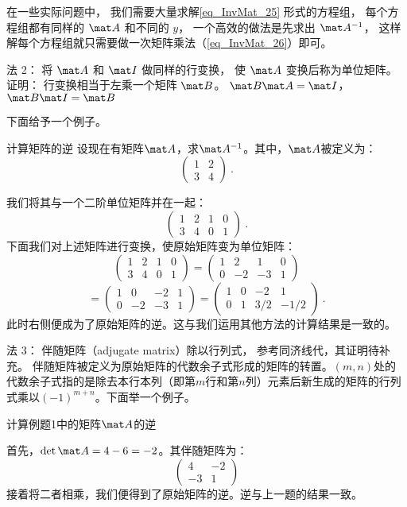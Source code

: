 在一些实际问题中， 我们需要大量求解\autoref{eq_InvMat_25} 形式的方程组， 每个方程组都有同样的 $\mat A$ 和不同的 $y$， 一个高效的做法是先求出 $\mat A^{-1}$， 这样解每个方程组就只需要做一次矩阵乘法（\autoref{eq_InvMat_26}）即可。

法 2： 将 $\mat A$ 和 $\mat I$ 做同样的行变换， 使 $\mat A$ 变换后称为单位矩阵。 
证明： 行变换相当于左乘一个矩阵 $\mat B$。 $\mat B\mat A = \mat I$， $\mat B \mat I = \mat B$

下面给予一个例子。
\begin{example}{计算矩阵的逆}
设现在有矩阵$\mat A$，求$\mat A^{-1}$。其中，$\mat A$被定义为：
$$
\left(
    \begin{matrix}
    1&2\\
    3&4
    \end{matrix}
\right)~.
$$
\end{example}
我们将其与一个二阶单位矩阵并在一起：
$$
\left(
    \begin{matrix}
    1&2&1&0\\
    3&4&0&1
    \end{matrix}
\right)~.
$$
下面我们对上述矩阵进行变换，使原始矩阵变为单位矩阵：
$$
\left(
    \begin{matrix}
    1&2&1&0\\
    3&4&0&1
    \end{matrix}\right)=\left(
    \begin{matrix}
    1&2&1&0\\
    0&-2&-3&1
    \end{matrix}\right)$$
    $$
    =\left(
    \begin{matrix}
    1&0&-2&1\\
    0&-2&-3&1
    \end{matrix}\right)=\left(
    \begin{matrix}
    1&0&-2&1\\
    0&1&3/2&-1/2
    \end{matrix}
\right)~.
$$
此时右侧便成为了原始矩阵的逆。这与我们运用其他方法的计算结果是一致的。

法 3： 伴随矩阵（adjugate matrix）除以行列式， 参考同济线代，其证明待补充。%
伴随矩阵被定义为原始矩阵的代数余子式形成的矩阵的转置。$(m,n)$处的代数余子式指的是除去本行本列（即第$m$行和第$n$列）元素后新生成的矩阵的行列式乘以$(-1)^{m+n}$。下面举一个例子。
\begin{example}{计算例题1中的矩阵$\mat A$的逆}
\end{example}
首先，$\det\mat A=4-6=-2$。其伴随矩阵为：
$$
\left(
\begin{matrix}
4&-2\\
-3&1
\end{matrix}
\right)
$$
接着将二者相乘，我们便得到了原始矩阵的逆。逆与上一题的结果一致。